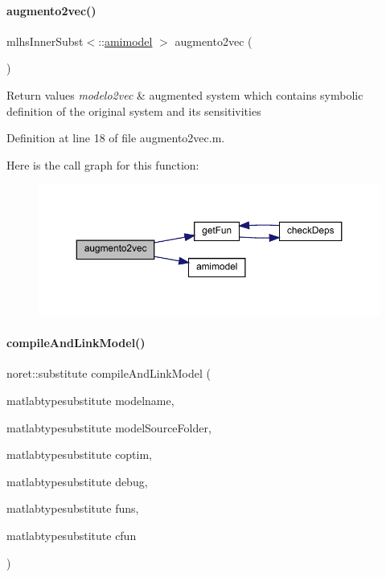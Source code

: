 \paragraph{\texorpdfstring{augmento2vec()}{augmento2vec()}}
{\footnotesize\ttfamily mlhs\+Inner\+Subst$<$\+::\mbox{\hyperlink{classamimodel}{amimodel}} $>$ augmento2vec (\begin{DoxyParamCaption}{ }\end{DoxyParamCaption})}


\begin{DoxyRetVals}{Return values}
{\em modelo2vec} & augmented system which contains symbolic definition of the original system and its sensitivities \\
\hline
\end{DoxyRetVals}


Definition at line 18 of file augmento2vec.\+m.

Here is the call graph for this function\+:
\nopagebreak
\begin{figure}[H]
\begin{center}
\leavevmode
\includegraphics[width=350pt]{classamimodel_ab8fea0d36484809cb38e0035a564e919_cgraph}
\end{center}
\end{figure}
\mbox{\label{classamimodel_a16e01624de4534ac1d1992bd685e2f56}} 
\paragraph{\texorpdfstring{compile\+And\+Link\+Model()}{compileAndLinkModel()}}
{\footnotesize\ttfamily noret\+::substitute compile\+And\+Link\+Model (\begin{DoxyParamCaption}\item[{matlabtypesubstitute}]{modelname,  }\item[{matlabtypesubstitute}]{model\+Source\+Folder,  }\item[{matlabtypesubstitute}]{coptim,  }\item[{matlabtypesubstitute}]{debug,  }\item[{matlabtypesubstitute}]{funs,  }\item[{matlabtypesubstitute}]{cfun }\end{DoxyParamCaption})\hspace{0.3cm}{\ttfamily [static]}}


